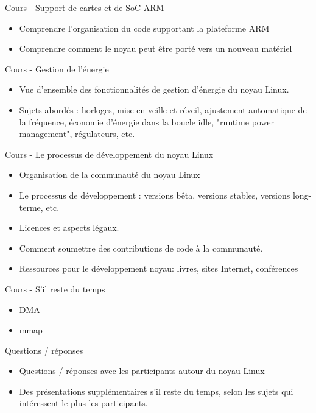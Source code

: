 \documentclass[a4paper,12pt,obeyspaces,spaces,hyphens]{article}
\begin{document}
\feagendatwocolumn
{Cours - Support de cartes et de SoC ARM}
{
  \begin{itemize}
  \item Comprendre l'organisation du code supportant la plateforme ARM
  \item Comprendre comment le noyau peut être porté vers un nouveau
    matériel
  \end{itemize}
}
{Cours - Gestion de l'énergie}
{
  \begin{itemize}
  \item Vue d'ensemble des fonctionnalités de gestion d'énergie du noyau
    Linux.
  \item Sujets abordés : horloges, mise en veille et réveil, ajustement
    automatique de la fréquence, économie d'énergie dans la boucle idle,
    "runtime power management", régulateurs, etc.
  \end{itemize}
}

\feagendaonecolumn
{Cours - Le processus de développement du noyau Linux}
{
  \begin{itemize}
  \item Organisation de la communauté du noyau Linux
  \item Le processus de développement : versions bêta, versions stables,
    versions long-terme, etc.
  \item Licences et aspects légaux.
  \item Comment soumettre des contributions de code à la communauté.
  \item Ressources pour le développement noyau: livres, sites Internet, conférences
  \end{itemize}
}

\newpage

\feagendatwocolumn
{Cours - S'il reste du temps}
{
  \begin{itemize}
  \item DMA
  \item mmap
  \end{itemize}
}
{Questions / réponses}
{
  \begin{itemize}
  \item Questions / réponses avec les participants autour du noyau Linux
  \item Des présentations supplémentaires s'il reste du temps, selon les sujets
	qui intéressent le plus les participants.
  \end{itemize}
}
\end{document}
